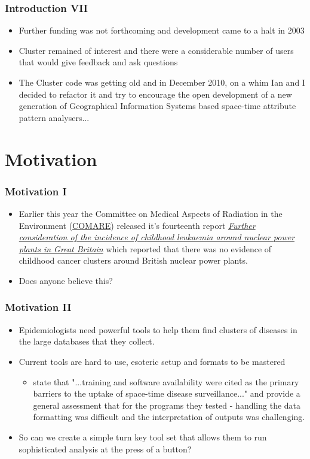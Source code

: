\documentclass{beamer}
\begin{document}
\begin{frame}[t]
\frametitle{Introduction VII}
\begin{itemize}
  \item Further funding was not forthcoming and development came to a halt in 2003
  \item Cluster remained of interest and there were a considerable number of users that would give feedback and ask questions
  \item The Cluster code was getting old and in December 2010, on a whim Ian and I decided to refactor it and try to encourage the open development of a new generation of Geographical Information Systems based space-time attribute pattern analysers...
\end{itemize}
\end{frame}


\section{Motivation}

\begin{frame}[t]
\frametitle{Motivation I}
\begin{itemize}
  \item Earlier this year the Committee on Medical Aspects of Radiation in the Environment (\href{http://www.comare.org.uk/}{COMARE}) released it's fourteenth report \href{http://www.comare.org.uk/press_releases/documents/COMARE14report.pdf}{\textit{Further consideration of the incidence of childhood leukaemia around nuclear power plants in Great Britain}} which reported that there was no evidence of childhood cancer clusters around British nuclear power plants.
  \item Does anyone believe this?
\end{itemize}
\end{frame}

\begin{frame}[t]
\frametitle{Motivation II}
\begin{itemize}
  \item Epidemiologists need powerful tools to help them find clusters of diseases in the large databases that they collect.
  \item Current tools are hard to use, esoteric setup and formats to be mastered
  \begin{itemize}
    \item \citet{citeulike:6854836} state that "...training and software availability were cited as the primary barriers to the uptake of space-time disease surveillance..." and provide a general assessment that for the programs they tested - handling the data formatting was difficult and the interpretation of outputs was challenging.
  \end{itemize}
  \item So can we create a simple turn key tool set that allows them to run sophisticated analysis at the press of a button?
\end{itemize}
\end{frame}
\end{document}

